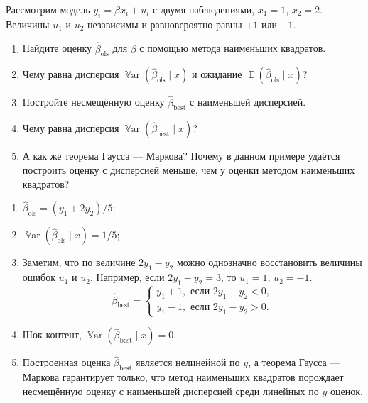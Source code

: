 \documentclass[12pt]{article}
\DeclareMathOperator{\Var}{\mathbb{V}ar}
\DeclareMathOperator{\E}{\mathbb{E}}
\newcommand{\hb}{\hat{\beta}}
\newcommand{\best}{\text{best}}
\newcommand{\ols}{\text{ols}}
\begin{document}
\begin{problem}
Рассмотрим модель $y_i = \beta x_i + u_i$ с двумя наблюдениями, $x_1 = 1$, $x_2 = 2$.
Величины $u_1$ и $u_2$ независимы и равновероятно равны $+1$ или $-1$.


\begin{enumerate}
  \item Найдите оценку $\hb_{\ols}$ для $\beta$ с помощью метода наименьших квадратов. 
  \item Чему равна дисперсия $\Var(\hb_{\ols} \mid x)$ и ожидание $\E(\hb_{\ols} \mid x)$?
  \item Постройте несмещённую оценку $\hb_{\best}$ с наименьшей дисперсией.
  \item Чему равна дисперсия $\Var(\hb_{\best}\mid x)$?
  \item А как же теорема Гаусса — Маркова? Почему в данном примере удаётся построить оценку с дисперсией меньше, чем у оценки методом наименьших квадратов?

\end{enumerate}
  \begin{sol}
    \begin{enumerate}
      \item $\hb_{\ols} = (y_1 + 2y_2)/5$;
      \item $\Var(\hb_{\ols}\mid x) = 1/5$;
      \item Заметим, что по величине $2y_1 - y_2$ можно однозначно восстановить величины ошибок $u_1$ и $u_2$.
      Например, если $2y_1 -y_2 = 3$, то $u_1 = 1$, $u_2 = -1$.
      \[
        \hb_{\best} = \begin{cases}
          y_1 + 1, \text{ если } 2y_1 - y_2 < 0,\\
          y_1 - 1, \text{ если } 2y_1 - y_2 >0.
        \end{cases}
      \]
      \item Шок контент, $\Var(\hb_{\best}\mid x) = 0$.
      \item Построенная оценка $\hb_{\best}$ является нелинейной по $y$, 
      а теорема Гаусса — Маркова гарантирует только, что метод наименьших квадратов 
      порождает несмещённую оценку с наименьшей дисперсией среди линейных по $y$ оценок. 
    \end{enumerate}
        
  \end{sol}
\end{problem}
\end{document}
